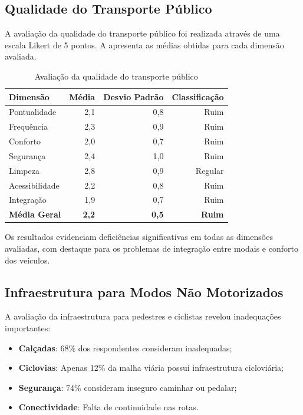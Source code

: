 \subsection{Qualidade do Transporte Público}

A avaliação da qualidade do transporte público foi realizada através de uma escala Likert de 5 pontos. A  apresenta as médias obtidas para cada dimensão avaliada.

\begin{table}[htb]
    \centering
    \caption{Avaliação da qualidade do transporte público}
    \label{tab:avaliacao-tp}
    \begin{tabular}{lrrr}
        \toprule
        \textbf{Dimensão} & \textbf{Média} & \textbf{Desvio Padrão} & \textbf{Classificação} \\
        \midrule
        Pontualidade & 2,1 & 0,8 & Ruim \\
        Frequência & 2,3 & 0,9 & Ruim \\
        Conforto & 2,0 & 0,7 & Ruim \\
        Segurança & 2,4 & 1,0 & Ruim \\
        Limpeza & 2,8 & 0,9 & Regular \\
        Acessibilidade & 2,2 & 0,8 & Ruim \\
        Integração & 1,9 & 0,7 & Ruim \\
        \midrule
        \textbf{Média Geral} & \textbf{2,2} & \textbf{0,5} & \textbf{Ruim} \\
        \bottomrule
    \end{tabular}
\end{table}

Os resultados evidenciam deficiências significativas em todas as dimensões avaliadas, com destaque para os problemas de integração entre modais e conforto dos veículos.

\subsection{Infraestrutura para Modos Não Motorizados}

A avaliação da infraestrutura para pedestres e ciclistas revelou inadequações importantes:

\begin{itemize}
    \item \textbf{Calçadas}: 68\% dos respondentes consideram inadequadas;
    \item \textbf{Ciclovias}: Apenas 12\% da malha viária possui infraestrutura cicloviária;
    \item \textbf{Segurança}: 74\% consideram inseguro caminhar ou pedalar;
    \item \textbf{Conectividade}: Falta de continuidade nas rotas.
\end{itemize}

